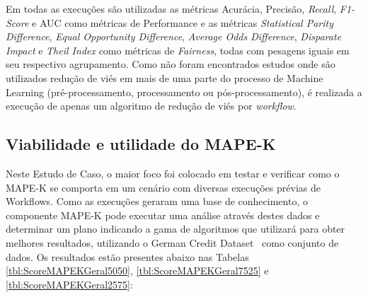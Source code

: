 \documentclass{article}
\begin{document}
Em todas as execuções são utilizadas as métricas Acurácia, Precisão, \textit{Recall}, \textit{F1-Score} e AUC como métricas de Performance e as métricas \textit{Statistical Parity Difference}, \textit{Equal Opportunity Difference}, \textit{Average Odds Difference}, \textit{Disparate Impact} e \textit{Theil Index} como métricas de \textit{Fairness}, todas com pesagens iguais em seu respectivo agrupamento. Como não foram encontrados estudos onde são utilizados redução de viés em mais de uma parte do processo de Machine Learning (pré-processamento, processamento ou pós-processamento), é realizada a execução de apenas um algoritmo de redução de viés por \textit{workflow}.

\subsection{Viabilidade e utilidade do MAPE-K}

 Neste Estudo de Caso, o maior foco foi colocado em testar e verificar como o MAPE-K se comporta em um cenário com diversas execuções prévias de Workflows. Como as execuções geraram uma base de conhecimento, o componente MAPE-K pode executar uma análise através destes dados e determinar um plano indicando a gama de algoritmos que utilizará para obter melhores resultados, utilizando o German Credit Dataset~\citep{ucigerman_2021} como conjunto de dados. Os resultados estão presentes abaixo nas Tabelas \ref{tbl:ScoreMAPEKGeral5050}, \ref{tbl:ScoreMAPEKGeral7525} e \ref{tbl:ScoreMAPEKGeral2575}:

\begin{table}[H]
\begin{center}
  \caption{Melhores opções escolhidas pelo modelo MAPE-K \\ Todos os métodos - 50\% Performance/50\% Fairness}
\label{tbl:ScoreMAPEKGeral5050}
\end{center}
\end{table}
\end{document}
